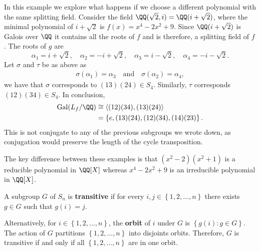 \documentclass[12pt, a4paper]{article}
\newcommand{\gal}{\text{Gal}}
\begin{document}
\begin{mdexample}
    In this example we explore what happens if we choose a different polynomial with the same splitting field. Consider the field \(\QQ(\sqrt{2},i)= \QQ(i+\sqrt{2})\), where the minimal polynomial of \(i+\sqrt{2}\) is \(f(x)=x^4-2x^2+9\). Since \(\QQ(i+\sqrt{2})\) is Galois over \(\QQ\) it contains all the roots of \(f\) and is therefore, a splitting field of \(f\). The roots of \(g\) are 
    \[\alpha_1 = i+\sqrt{2}, \quad \alpha_2 = -i +\sqrt{2},\quad \alpha_3=i-\sqrt{2}, \quad \alpha_4 = -i-\sqrt{2}.\]
    Let \(\sigma\) and \(\tau\) be as above as 
    \[\begin{aligned}
        \sigma(\alpha_1)=\alpha_3 \quad \text{and} \quad \sigma(\alpha_2)=\alpha_4,
    \end{aligned}\]
    we have that \(\sigma\) corresponds to \((13)(24) \in S_4\). Similarly, \(\tau\) corresponds \((12)(34) \in S_4\). In conclusion, 
    \[\begin{aligned}
        \gal(L_f/\QQ) &\cong \langle (12)(34),(13)(24) \rangle  \\
        &= \left\{ e,(13)(24),(12)(34),(14)(23) \right\}.
    \end{aligned}\]
    This is not conjugate to any of the previous subgroups we wrote down, as conjugation would preserve the length of the cycle transposition.
\end{mdexample}

\begin{mdremark}
    The key difference between these examples is that \((x^2-2)(x^2+1)\) is a reducible polynomial in \(\QQ[X]\) whereas \(x^4-2x^2+9\) is an irreducible polynomial in \(\QQ[X]\).
\end{mdremark}

\begin{definition}
    A subgroup \(G\) of \(S_n\) is \textbf{transitive} if for every \(i,j \in \left\{ 1,2,\ldots,n \right\}\) there exists \(g\in G\) such that \(g(i)=j\).
\end{definition}

\begin{mdremark}
    Alternatively, for \(i \in \left\{ 1,2,\ldots,n \right\}\), the \textbf{orbit} of \(i\) under \(G\) is \(\left\{ g(i) :g\in G \right\}\). The action of \(G\) partitions \(\left\{ 1,2,\ldots,n \right\}\) into disjoints orbits. Therefore, \(G\) is transitive if and only if all \(\left\{ 1,2,\ldots,n \right\}\) are in one orbit.
\end{mdremark}
\end{document}
